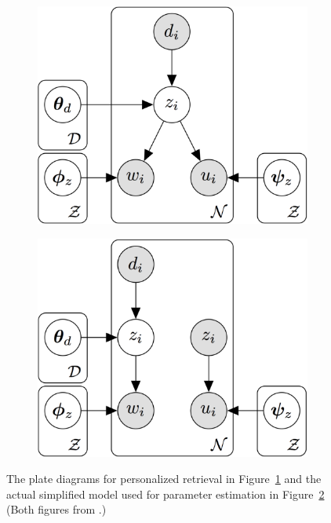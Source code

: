 \begin{figure}
  \begin{center}
  \begin{subfigure}{.5\textwidth}
  \centering
  \includegraphics[width=0.8\linewidth]{figures/ptm}
  \caption{}
  \label{fig:ptm-original}
  \end{subfigure}%
  \begin{subfigure}{.5\textwidth}
  \centering
  \includegraphics[width=0.8\linewidth]{figures/ptm-simplified}
  \caption{}
  \label{fig:ptm-simplified}
  \end{subfigure}
  \end{center}
  \caption{ The plate diagrams for personalized retrieval in
    Figure~\ref{fig:ptm-original} and the actual simplified model used
    for parameter estimation in Figure~\ref{fig:ptm-simplified} (Both
    figures from \citet{Harvey-2013}.)}
  \label{fig:ptm}
\end{figure}

